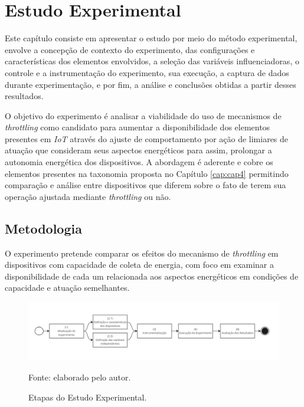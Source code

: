 \chapter{Estudo Experimental}
\label{cap:cap6}

Este capítulo consiste em apresentar o estudo por meio do método experimental, envolve a concepção de contexto do experimento, das configurações e características dos elementos envolvidos, a seleção das variáveis influenciadoras, o controle e a instrumentação do experimento, sua execução, a captura de dados durante experimentação, e por fim, a análise e conclusões obtidas a partir desses resultados. 

O objetivo do experimento é analisar a viabilidade do uso de mecanismos de \textit{throttling} como candidato para aumentar a disponibilidade dos elementos presentes em \textit{IoT} através do ajuste de comportamento por ação de limiares de atuação que consideram seus aspectos energéticos para assim,  prolongar a autonomia energética dos dispositivos. A abordagem é aderente e cobre os elementos presentes na taxonomia proposta no Capítulo \ref{cap:cap4} permitindo comparação e análise entre dispositivos que diferem sobre o fato de terem sua operação ajustada mediante \textit{throttling} ou não. 

\section{Metodologia}

O experimento pretende comparar os efeitos do mecanismo de \textit{throttling} em dispositivos com capacidade de coleta de energia, com foco em examinar a disponibilidade de cada um relacionada aos aspectos energéticos em condições de capacidade e atuação semelhantes.

\begin{figure}[H]
	\centering
	\caption{Etapas do Estudo Experimental.}
	\label{fig:cap6metodologia}
	\includegraphics[width=1\linewidth]{Imagens/cap6/cap6metodologia.jpg}
	
	Fonte: elaborado pelo autor.
\end{figure} 

